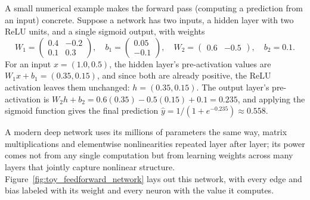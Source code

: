 \documentclass[../ai_in_finance]{subfiles}
\begin{document}
A small numerical example makes the forward pass (computing a prediction from an input) concrete. Suppose a network has two inputs, a hidden layer with two ReLU units, and a single sigmoid output, with weights
\begin{equation*}
W_1 = \begin{pmatrix} 0.4 & -0.2 \\ 0.1 & 0.3 \end{pmatrix}, \quad b_1 = \begin{pmatrix} 0.05 \\ -0.1 \end{pmatrix}, \quad W_2 = \begin{pmatrix} 0.6 & -0.5 \end{pmatrix}, \quad b_2 = 0.1.
\end{equation*}
For an input $x = (1.0, 0.5)$, the hidden layer's pre-activation values are $W_1 x + b_1 = (0.35, 0.15)$, and since both are already positive, the ReLU activation leaves them unchanged: $h = (0.35, 0.15)$. The output layer's pre-activation is $W_2 h + b_2 = 0.6(0.35) - 0.5(0.15) + 0.1 = 0.235$, and applying the sigmoid function gives the final prediction $\hat y = 1/(1+e^{-0.235}) \approx 0.558$.

A modern deep network uses its millions of parameters the same way, matrix multiplications and elementwise nonlinearities repeated layer after layer; its power comes not from any single computation but from learning weights across many layers that jointly capture nonlinear structure. Figure~\ref{fig:toy_feedforward_network} lays out this network, with every edge and bias labeled with its weight and every neuron with the value it computes.

\label{sec:backprop-example}
\end{document}
